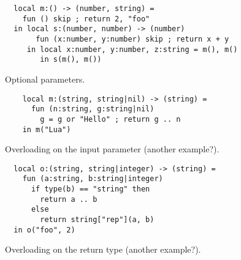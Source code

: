 
\begin{verbatim}
  local m:() -> (number, string) =
    fun () skip ; return 2, "foo"
  in local s:(number, number) -> (number)
       fun (x:number, y:number) skip ; return x + y
     in local x:number, y:number, z:string = m(), m()
        in s(m(), m())
\end{verbatim}

Optional parameters.

\begin{verbatim}
    local m:(string, string|nil) -> (string) =
      fun (n:string, g:string|nil)
        g = g or "Hello" ; return g .. n
    in m("Lua")
\end{verbatim}

Overloading on the input parameter (another example?).

\begin{verbatim}
  local o:(string, string|integer) -> (string) =
    fun (a:string, b:string|integer)
      if type(b) == "string" then
        return a .. b
      else
        return string["rep"](a, b)
  in o("foo", 2) 
\end{verbatim}

Overloading on the return type (another example?).

